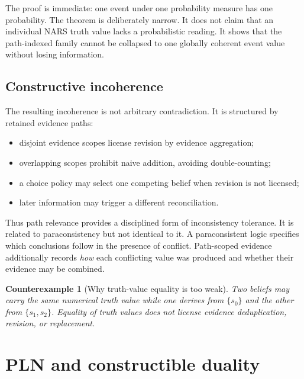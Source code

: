 \documentclass[11pt]{article}
\newtheorem{counterexample}[definition]{Counterexample}
\theoremstyle{remark}
\begin{document}
The proof is immediate: one event under one probability measure has one
probability.  The theorem is deliberately narrow.  It does not claim that an
individual NARS truth value lacks a probabilistic reading.  It shows that the
path-indexed family cannot be collapsed to one globally coherent event value
without losing information.

\subsection{Constructive incoherence}

The resulting incoherence is not arbitrary contradiction.  It is structured
by retained evidence paths:
\begin{itemize}
  \item disjoint evidence scopes license revision by evidence aggregation;
  \item overlapping scopes prohibit naive addition, avoiding double-counting;
  \item a choice policy may select one competing belief when revision is not
        licensed;
  \item later information may trigger a different reconciliation.
\end{itemize}

Thus path relevance provides a disciplined form of inconsistency tolerance.
It is related to paraconsistency but not identical to it.  A paraconsistent
logic specifies which conclusions follow in the presence of conflict.
Path-scoped evidence additionally records \emph{how} each conflicting value
was produced and whether their evidence may be combined.

\begin{counterexample}[Why truth-value equality is too weak]
Two beliefs may carry the same numerical truth value while one derives from
$\{s_0\}$ and the other from $\{s_1,s_2\}$.  Equality of truth values does not
license evidence deduplication, revision, or replacement.
\end{counterexample}

\section{PLN and constructible duality}
\end{document}
